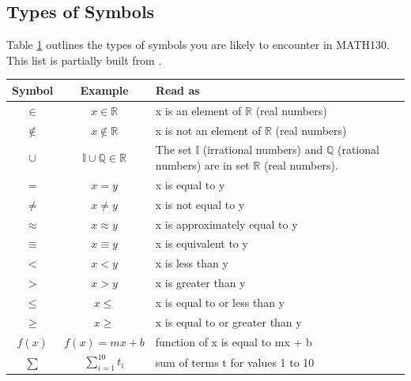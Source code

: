 \subsection{Types of Symbols}
\label{sec:TypesOfSymbols}
Table \ref{tab:TypesOfSymbols} outlines the types of symbols you are likely
to encounter in MATH130. This list is partially built from \citet{IjPb7}.
\begin{table}[!htb]
\label{tab:TypesOfSymbols}
\begin{tabularx}{\linewidth}{| c || c | X |}
  \hline
  Symbol & Example & Read as \\ \hline \hline
  $ \in    $ & $ x \in    \mathbb{R} $ & x is an element of $\mathbb{R}$ (real
                                       numbers)                       \\ \hline
  $ \notin $ & $ x \notin \mathbb{R} $ & x is not an element of $\mathbb{R}$
                                       (real numbers)                 \\ \hline
  $ \cup   $ & $ \mathbb{I} \cup \mathbb{Q} \in \mathbb{R}$
                                       & The set $\mathbb{I}$ (irrational
                                       numbers) and $ \mathbb{Q} $ (rational
                                       numbers) are in set $\mathbb{R}$ (real
                                       numbers).                      \\ \hline
  $ =       $ & $ x = y       $ & x is equal to y                     \\ \hline
  $ \neq    $ & $ x \neq    y $ & x is not equal to y                 \\ \hline
  $ \approx $ & $ x \approx y $ & x is approximately equal to y       \\ \hline
  $ \equiv  $ & $ x \equiv  y $ & x is equivalent to y                \\ \hline
  $ <       $ & $ x < y       $ & x is less than y                    \\ \hline
  $ >       $ & $ x > y       $ & x is greater than y                 \\ \hline
  $ \leq    $ & $ x \leqslant $ & x is equal to or less than y        \\ \hline
  $ \geq    $ & $ x \geqslant $ & x is equal to or greater than y     \\ \hline
  $ f(x)    $ & $ f(x) = mx + b $ & function of x is equal to mx + b  \\ \hline
  $ \sum    $ & $ \sum_{i=1}^{10} t_i $ & sum of terms t for values 1 to 10
                                                                      \\ \hline

\end{tabularx}
\end{table}
